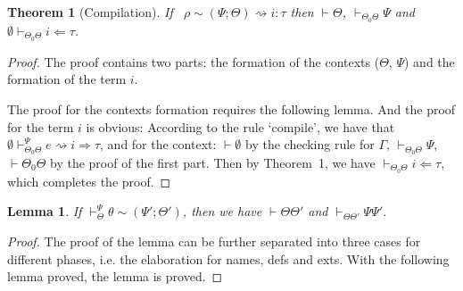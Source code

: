 \documentclass[letterpaper, notitlepage]{article}
\newtheorem{theorem}{Theorem}
\newtheorem{lemma}{Lemma}
\begin{document}
\begin{theorem}[Compilation]
If ~$\rho\sim(\Psi;\Theta)\rightsquigarrow i:\tau$ then $\vdash\Theta$, $\vdash_{\Theta_0\Theta}\Psi$ and $\emptyset\vdash_{\Theta_0\Theta} i\Leftarrow\tau$.
\end{theorem}
\begin{proof}
The proof contains two parts: the formation of the contexts ($\Theta$, $\Psi$) and the formation of the term $i$.

The proof for the contexts formation requires the following lemma. And the proof for the term $i$ is obvious: According to the rule `compile', we have that $\emptyset\vdash_{\Theta_0\Theta}^{\Psi}e\rightsquigarrow i\Rightarrow \tau$, and for the context: $\vdash\emptyset$ by the checking rule for $\Gamma$, $\vdash_{\Theta_0\Theta}\Psi$, $\vdash\Theta_0\Theta$ by the proof of the first part. Then by Theorem~1, we have $\vdash_{\Theta_0\Theta}i\Leftarrow\tau$, which completes the proof.
\end{proof}

\begin{lemma} If $\vdash_{\Theta}^{\Psi}\theta\sim(\Psi';\Theta')$, then we have $\vdash\Theta\Theta'$ and $\vdash_{\Theta\Theta'}\Psi\Psi'$.
\end{lemma}
\begin{proof}
The proof of the lemma can be further separated into three cases for different phases, i.e. the elaboration for names, defs and exts. With the following lemma proved, the lemma is proved.
\end{proof}
\end{document}
